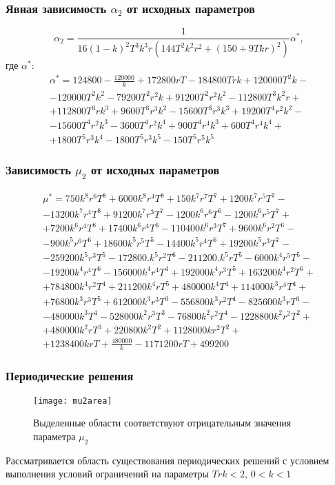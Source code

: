\documentclass[12pt]{beamer}
\begin{document}
\begin{frame}
\frametitle{Явная зависимость $\alpha_2$ от исходных параметров}
    \begin{equation*}
 \alpha_2 =\frac{1}{16 (1-k)^2 T^3 k^3 r(144 T^2 k^2 r^2 + (150+9 T k r)^2)} \alpha^*,
\end{equation*}
где $\alpha^*$:
\begin{multline*}
    \alpha^*=124800-\frac{120000}{k}+172800 r T -184800 T r k+120000 T^2 k -\\- 120000 T^2 k^2 - 79200 T^2 r^2 k +91200 T^2 r^2 k^2 -112800 T^3 k^2 r +\\+112800 T^3 r k^3+ 9600 T^3 r^3 k^2 -15600 T^3 r^3 k^3 + 19200 T^4 r^2 k^2 -\\-15600 T^4 r^2 k^3 -3600 T^4 r^2 k^4 +900 T^4 r^4 k^3 +600 T^4 r^4 k^4 +\\+ 1800 T^5 r^3 k^4 -1800 T^5 r^3 k^5 -150 T^5 r^5 k^5
\end{multline*}
\end{frame}
\begin{frame}
    \frametitle{Зависимость $\mu_2$ от исходных параметров}
    \begin{multline*}
    \mu^*=750 k^8 r^6 T^8+6000 k^8 r^4 T^8+150 k^7 r^7 T^7+1200 k^7 r^5 T^7-\\-13200 k^7 r^4 T^8+91200 k^7 r^3 T^7-1200 k^6 r^6 T^6-1200 k^6 r^5 T^7+\\+7200 k^6 r^4 T^8+17400 k^6 r^4 T^6-110400 k^6 r^3 T^7+9600 k^6 r^2 T^6-\\-900 k^5 r^6 T^6+18600 k^5 r^5 T^5-14400 k^5 r^4 T^6+19200 k^5 r^3 T^7-\\-259200 k^5 r^3 T^5-172800. k^5 r^2 T^6-211200. k^5 r T^5-6000 k^4 r^5 T^5-\\-19200 k^4 r^4 T^6-156000 k^4 r^4 T^4+192000 k^4 r^3 T^5+163200 k^4 r^2 T^6+\\+784800 k^4 r^2 T^4+211200 k^4 r T^5+480000 k^4 T^4+114000 k^3 r^4 T^4+\\+76800 k^3 r^3 T^5+612000 k^3 r^3 T^3-556800 k^3 r^2 T^4-825600 k^3 r T^3-\\-480000 k^3 T^4-528000 k^2 r^3 T^3-76800 k^2 r^2 T^4-1228800 k^2 r^2 T^2+\\+480000 k^2 r T^3+220800 k^2 T^2+1128000 k r^2 T^2+\\+1238400 k r T+\frac{480000}{k}-1171200 r T+499200
\end{multline*}
\end{frame}
\begin{frame}
\frametitle{Периодические решения}
  \begin{figure}
    \centering
    \texttt{[image: mu2area]}
    \caption{Выделенные области соответствуют отрицательным значения параметра $\mu_2$}
    \label{fig:mu2}
\end{figure}
Рассматривается область существования периодических решений с условием выполнения условий ограничений на параметры
$T r k <2$, $0<k<1$
\end{frame}
\end{document}
